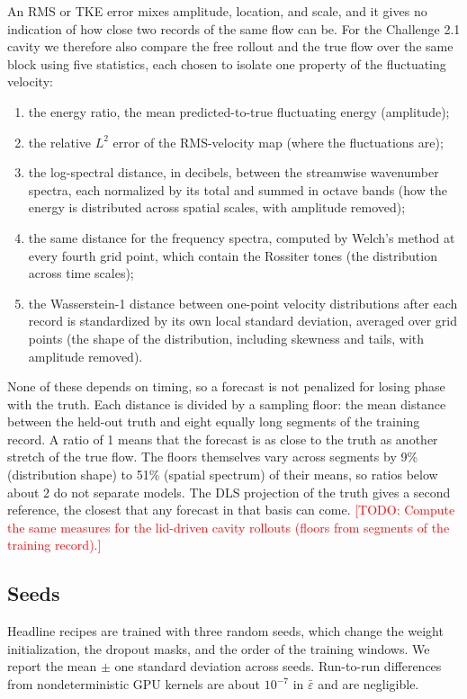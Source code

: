\documentclass[conf]{new-aiaa}
\newcommand{\todo}[1]{\textcolor{red}{[TODO: #1]}}
\begin{document}
An RMS or TKE error mixes amplitude, location, and scale, and it gives no indication of how close two records of the same flow can be. For the Challenge 2.1 cavity we therefore also compare the free rollout and the true flow over the same block using five statistics, each chosen to isolate one property of the fluctuating velocity:
\begin{enumerate}
  \item the energy ratio, the mean predicted-to-true fluctuating energy (amplitude);
  \item the relative $L^2$ error of the RMS-velocity map (where the fluctuations are);
  \item the log-spectral distance, in decibels, between the streamwise wavenumber spectra, each normalized by its total and summed in octave bands (how the energy is distributed across spatial scales, with amplitude removed);
  \item the same distance for the frequency spectra, computed by Welch's method at every fourth grid point, which contain the Rossiter tones (the distribution across time scales);
  \item the Wasserstein-1 distance between one-point velocity distributions after each record is standardized by its own local standard deviation, averaged over grid points (the shape of the distribution, including skewness and tails, with amplitude removed).
\end{enumerate}
None of these depends on timing, so a forecast is not penalized for losing phase with the truth. Each distance is divided by a sampling floor: the mean distance between the held-out truth and eight equally long segments of the training record. A ratio of 1 means that the forecast is as close to the truth as another stretch of the true flow. The floors themselves vary across segments by 9\% (distribution shape) to 51\% (spatial spectrum) of their means, so ratios below about 2 do not separate models. The DLS projection of the truth gives a second reference, the closest that any forecast in that basis can come. \todo{Compute the same measures for the lid-driven cavity rollouts (floors from segments of the training record).}

\subsection{Seeds}
Headline recipes are trained with three random seeds, which change the weight initialization, the dropout masks, and the order of the training windows. We report the mean $\pm$ one standard deviation across seeds. Run-to-run differences from nondeterministic GPU kernels are about $10^{-7}$ in $\bar\varepsilon$ and are negligible.
\end{document}
